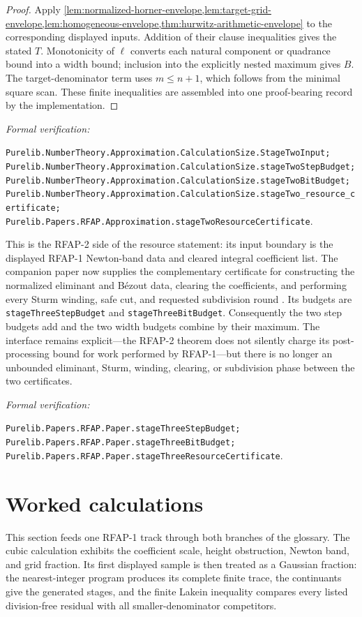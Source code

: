 \documentclass[11pt]{article}
\newcommand{\leanref}[1]{\par\smallskip\noindent
  \emph{Formal verification:}\par\nobreak
  {\raggedright\nolinkurl{#1}.\par}}
\begin{document}
\begin{proof}
Apply
\cref{lem:normalized-horner-envelope,lem:target-grid-envelope,lem:homogeneous-envelope,thm:hurwitz-arithmetic-envelope}
to the corresponding
displayed inputs.  Addition of their clause inequalities gives the stated
$T$.  Monotonicity of $\ell$ converts each natural component or quadrance
bound into a width bound; inclusion into the explicitly nested maximum gives
$B$.  The target-denominator term uses $m\le n+1$, which follows from the
minimal square scan.  These finite inequalities are assembled into one
proof-bearing record by the implementation.
\end{proof}

\leanref{Purelib.NumberTheory.Approximation.CalculationSize.StageTwoInput;
Purelib.NumberTheory.Approximation.CalculationSize.stageTwoStepBudget;
Purelib.NumberTheory.Approximation.CalculationSize.stageTwoBitBudget;
Purelib.NumberTheory.Approximation.CalculationSize.stageTwo_resource_certificate;
Purelib.Papers.RFAP.Approximation.stageTwoResourceCertificate}

This is the RFAP-2 side of the resource statement: its input boundary is the
displayed RFAP-1 Newton-band data and cleared integral coefficient list.  The
companion paper now supplies the complementary certificate for constructing
the normalized eliminant and B\'ezout data, clearing the coefficients, and
performing every Sturm winding, safe cut, and requested subdivision round
\cite{RFAPOne}.  Its budgets are
\texttt{stageThreeStepBudget} and \texttt{stageThreeBitBudget}.  Consequently
the two step budgets add and the two width budgets combine by their maximum.
The interface remains explicit---the RFAP-2 theorem does not silently charge
its post-processing bound for work performed by RFAP-1---but there is no
longer an unbounded eliminant, Sturm, winding, clearing, or subdivision phase
between the two certificates.

\leanref{Purelib.Papers.RFAP.Paper.stageThreeStepBudget;
Purelib.Papers.RFAP.Paper.stageThreeBitBudget;
Purelib.Papers.RFAP.Paper.stageThreeResourceCertificate}

\section{Worked calculations}
\label{sec:cubic}

This section feeds one RFAP-1 track through both branches of the glossary.
The cubic calculation exhibits the coefficient scale, height obstruction,
Newton band, and grid fraction.  Its first displayed sample is then treated
as a Gaussian fraction: the nearest-integer program produces its complete
finite trace, the continuants give the generated stages, and the finite
Lakein inequality compares every listed division-free residual with all
smaller-denominator competitors.
\end{document}
